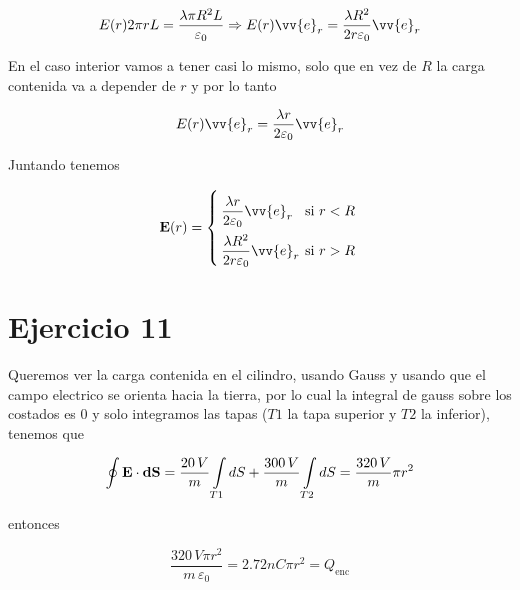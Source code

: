 \documentclass[leqno, 12pt, twoside, letterpaper]{book}
\def\efield{\textbf{E}}
\def\vdiff{\textbf{dS}}
\begin{document}
\[ E(r) 2 \pi r L = \dfrac{\lambda\pi R^2 L}{\varepsilon_0} \Rightarrow  E(r) \vv{e}_r = \dfrac{\lambda R^2 }{2 r \varepsilon_0} \vv{e}_r\]

En el caso interior vamos a tener casi lo mismo, solo que en vez de $R$ la carga contenida va a depender de $r$ y por lo tanto 

\[ E(r) \vv{e}_r = \dfrac{\lambda r }{2 \varepsilon_0} \vv{e}_r\]

Juntando tenemos

$$ \efield(r) = \twopartdef{\dfrac{\lambda r }{2 \varepsilon_0} \vv{e}_r}{ r < R }{\dfrac{\lambda R^2 }{2 r \varepsilon_0} \vv{e}_r}{\textrm{si } r > R} $$


\section*{Ejercicio 11} 

Queremos ver la carga contenida en el cilindro, usando Gauss y usando que el campo electrico se orienta hacia la tierra, por lo cual la integral de gauss sobre los costados es 0 y solo integramos las tapas ($T1$ la tapa superior y $T2$ la inferior), tenemos que

\[ \oint \efield \cdot \vdiff = \dfrac{20 \, V}{m} \int\displaylimits_{T1} dS +  \dfrac{300 \,V}{m}\int\displaylimits_{T2} dS = \dfrac{320 \, V}{m} \pi r^2 \]

entonces
 
$$  \dfrac{320 \, V \pi r^2 }{m \, \varepsilon_0} = 2.72nC \pi r^2 =  Q_{\textrm{enc}} $$
\end{document}
